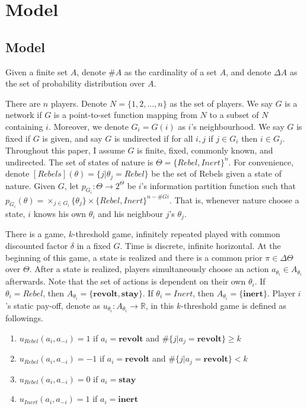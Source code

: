 \documentclass[12pt,letter]{article}
\theoremstyle{definition}
\theoremstyle{remark}
\theoremstyle{claim}
\begin{document}
\section{Model}
\label{sec:model}
\subsection{Model}
Given a finite set $A$, denote $\#A$ as the cardinality of a set $A$, and denote $\Delta A$ as the set of probability distribution over $A$.

There are $n$ players. Denote $N=\{1,2,...,n\}$ as the set of players.  We say $G$ is a network if $G$ is a point-to-set function mapping from $N$ to a subset of $N$ containing $i$. Moreover, we denote $G_i=G(i)$ as $i$'s neighbourhood. We say $G$ is fixed if $G$ is given, and say $G$ is undirected if for all $i,j$ if $j\in G_i$ then $i\in G_j$. Throughout this paper, I assume $G$ is finite, fixed, commonly known, and undirected. The set of states of nature is $\Theta=\{Rebel,Inert\}^n$. For convenience, denote $[Rebels](\theta)=\{j|\theta_j=Rebel\}$ be the set of Rebels given a state of nature. Given $G$, let $p_{G_i}:\Theta \rightarrow 2^{\Theta}$ be $i$'s information partition function such that $p_{G_i}(\theta)=\times_{j\in G_i}\{\theta_j\}\times \{Rebel,Inert\}^{n-\#G{i}}$. That is, whenever nature choose a state, $i$ knows his own $\theta_i$ and his neighbour $j$'s $\theta_j$. 

There is a game, $k$-threshold game, infinitely repeated played with common discounted factor $\delta$ in a fixed $G$. Time is discrete, infinite horizontal. At the beginning of this game, a state is realized and there is a common prior $\pi\in \Delta \Theta$ over $\Theta$. After a state is realized, players simultaneously choose an action $a_{\theta_i}\in A_{\theta_i}$ afterwards. Note that the set of actions is dependent on their own $\theta_i$. If $\theta_i=Rebel$, then $A_{\theta_i}=\{\textbf{revolt}, \textbf{stay}\}$.  If $\theta_i=Inert$, then $A_{\theta_i}=\{\textbf{inert}\}$. Player $i$'s static pay-off, denote as $u_{\theta_i}: A_{\theta_i}\rightarrow \mathbb{R}$, in this $k$-threshold game is defined as followings. 
\begin{enumerate}
\item $u_{Rebel}(a_i,a_{-i})=1$ if $a_i=\textbf{revolt}$ and $\#\{j|a_j=\textbf{revolt}\}\geq k$
\item $u_{Rebel}(a_i,a_{-i})=-1$ if $a_i=\textbf{revolt}$ and $\#\{j|a_j=\textbf{revolt}\}< k$
\item $u_{Rebel}(a_i,a_{-i})=0$ if $a_i=\textbf{stay}$
\item $u_{Inert}(a_i,a_{-i})=1$ if $a_i=\textbf{inert}$
\end{enumerate}
\end{document}
